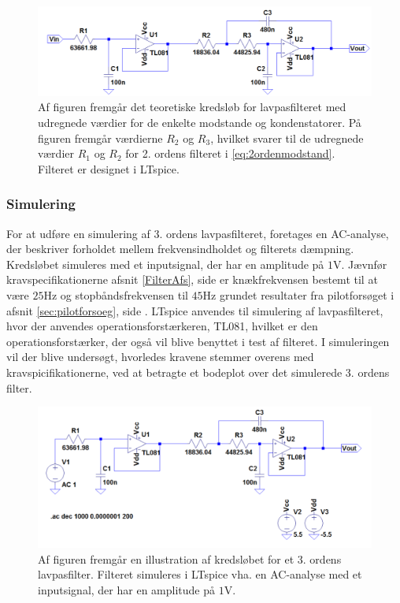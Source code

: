 \begin{figure}[H]
	\centering
	\includegraphics[scale=0.5]{figures/cProblemloesning/Lavpasfilter1_LTspice.PNG}
	\caption{Af figuren fremgår det teoretiske kredsløb for lavpasfilteret med udregnede værdier for de enkelte modstande og kondenstatorer. På figuren fremgår værdierne $R_{2}$ og $R_{3}$, hvilket svarer til de udregnede værdier $R_{1}$ og $R_{2}$ for 2. ordens filteret i \eqref{eq:2ordenmodstand}. Filteret er designet i LTspice.}
	\label{fig:lavpasfilter1_LTspice}
\end{figure}

\subsubsection{Simulering}
For at udføre en simulering af 3. ordens lavpasfilteret, foretages en AC-analyse, der beskriver forholdet mellem frekvensindholdet og filterets dæmpning. Kredsløbet simuleres med et inputsignal, der har en amplitude på $1$V. Jævnfør kravspecifikationerne afsnit \ref{FilterAfs}, side \pageref{FilterAfs} er knækfrekvensen bestemt til at være $25$Hz og stopbåndsfrekvensen til $45$Hz grundet resultater fra pilotforsøget i afsnit \ref{sec:pilotforsoeg}, side \pageref{sec:pilotforsoeg}. LTspice anvendes til simulering af lavpasfilteret, hvor der anvendes operationsforstærkeren, TL081, hvilket er den operationsforstærker, der også vil blive benyttet i test af filteret. I simuleringen vil der blive undersøgt, hvorledes kravene stemmer overens med kravspicifikationerne, ved at betragte et bodeplot over det simulerede 3. ordens filter.

\begin{figure}[H]
	\centering
	\includegraphics[scale=0.45]{figures/cProblemloesning/Lavpasfilter_LTspice.PNG}
	\caption{Af figuren fremgår en illustration af kredsløbet for et 3. ordens lavpasfilter. Filteret simuleres i LTspice vha. en AC-analyse med et inputsignal, der har en amplitude på $1$V.}
	\label{fig:lavpasfilter_LTspice}
\end{figure}

